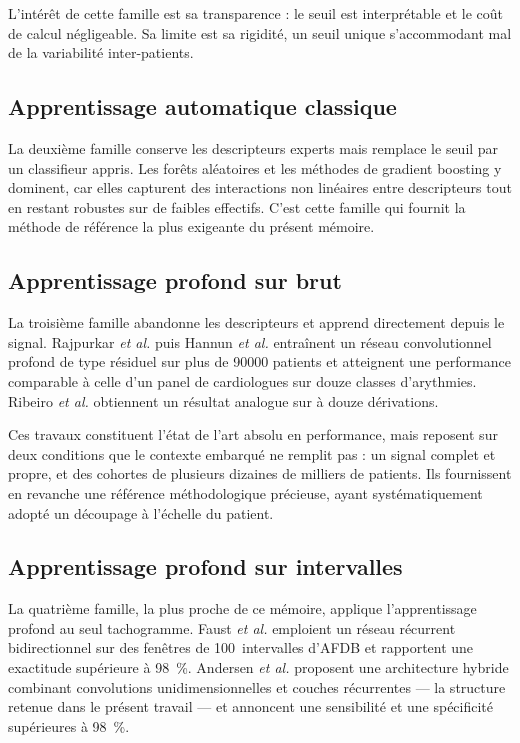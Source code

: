 L'intérêt de cette famille est sa transparence : le seuil est interprétable et le coût de calcul négligeable. Sa limite est sa rigidité, un seuil unique s'accommodant mal de la variabilité inter-patients.

\subsection{Apprentissage automatique classique}
La deuxième famille conserve les descripteurs experts mais remplace le seuil par un classifieur appris. Les forêts aléatoires \cite{breiman2001random} et les méthodes de gradient boosting \cite{chen2016xgboost,ke2017lightgbm} y dominent, car elles capturent des interactions non linéaires entre descripteurs tout en restant robustes sur de faibles effectifs. C'est cette famille qui fournit la méthode de référence la plus exigeante du présent mémoire.

\subsection{Apprentissage profond sur \ECG{} brut}
La troisième famille abandonne les descripteurs et apprend directement depuis le signal. Rajpurkar \textit{et al.} puis Hannun \textit{et al.} \cite{hannun2019cardiologist} entraînent un réseau convolutionnel profond de type résiduel sur plus de \num{90000} patients et atteignent une performance comparable à celle d'un panel de cardiologues sur douze classes d'arythmies. Ribeiro \textit{et al.} \cite{ribeiro2020automatic} obtiennent un résultat analogue sur \ECG{} à douze dérivations.

Ces travaux constituent l'état de l'art absolu en performance, mais reposent sur deux conditions que le contexte embarqué ne remplit pas : un signal \ECG{} complet et propre, et des cohortes de plusieurs dizaines de milliers de patients. Ils fournissent en revanche une référence méthodologique précieuse, ayant systématiquement adopté un découpage à l'échelle du patient.

\subsection{Apprentissage profond sur intervalles \RR{}}
La quatrième famille, la plus proche de ce mémoire, applique l'apprentissage profond au seul tachogramme. Faust \textit{et al.} \cite{faust2018automated} emploient un réseau récurrent \LSTM{} bidirectionnel sur des fenêtres de 100~intervalles \RR{} d'AFDB et rapportent une exactitude supérieure à 98~\%. Andersen \textit{et al.} \cite{andersen2019deep} proposent une architecture hybride combinant convolutions unidimensionnelles et couches récurrentes — la structure retenue dans le présent travail — et annoncent une sensibilité et une spécificité supérieures à 98~\%.

